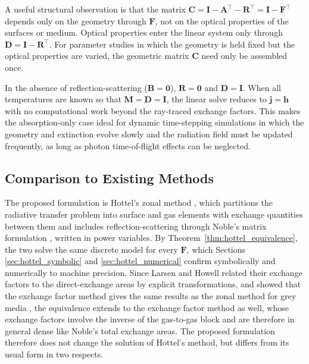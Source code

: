\documentclass[preprint,1p,times]{elsarticle}
\theoremstyle{plain}
\theoremstyle{definition}
\theoremstyle{remark}
\begin{document}
A useful structural observation is that the matrix $\mathbf{C} = \mathbf{I} - \mathbf{A}^\top - \mathbf{R}^\top = \mathbf{I} - \mathbf{F}^\top$ depends only on the geometry through $\mathbf{F}$, not on the optical properties of the surfaces or medium. Optical properties enter the linear system only through $\mathbf{D} = \mathbf{I} - \mathbf{R}^\top$. For parameter studies in which the geometry is held fixed but the optical properties are varied, the geometric matrix $\mathbf{C}$ need only be assembled once.

In the absence of reflection-scattering ($\mathbf{B} = \mathbf{0}$), $\mathbf{R} = \mathbf{0}$ and $\mathbf{D} = \mathbf{I}$. When all temperatures are known so that $\mathbf{M} = \mathbf{D} = \mathbf{I}$, the linear solve reduces to $\mathbf{j} = \mathbf{h}$ with no computational work beyond the ray-traced exchange factors. This makes the absorption-only case ideal for dynamic time-stepping simulations in which the geometry and extinction evolve slowly and the radiation field must be updated frequently, as long as photon time-of-flight effects can be neglected.

\subsection{Comparison to Existing Methods}

The proposed formulation is Hottel's zonal method \citep{Hottel1958, Hottel1967}, which partitions the radiative transfer problem into surface and gas elements with exchange quantities between them and includes reflection-scattering through Noble's matrix formulation \citep{Noble1975}, written in power variables. By Theorem~\ref{thm:hottel_equivalence}, the two solve the same discrete model for every $\mathbf{F}$, which Sections \ref{sec:hottel_symbolic} and \ref{sec:hottel_numerical} confirm symbolically and numerically to machine precision. Since Larsen and Howell related their exchange factors to the direct-exchange areas by explicit transformations, and showed that the exchange factor method gives the same results as the zonal method for grey media \citep{Larsen1983, LarsenHowell1985}, the equivalence extends to the exchange factor method as well, whose exchange factors involve the inverse of the gas-to-gas block and are therefore in general dense like Noble's total exchange areas. The proposed formulation therefore does not change the solution of Hottel's method, but differs from its usual form in two respects.
\end{document}
